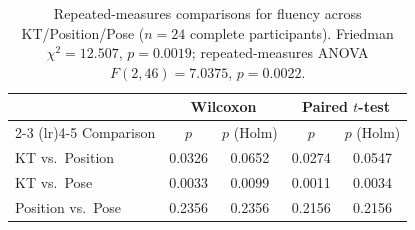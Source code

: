 \begin{table}[htbp]
\centering
\caption{Repeated-measures comparisons for fluency across KT/Position/Pose ($n = 24$ complete participants). Friedman $\chi^2 = 12.507$, $p = 0.0019$; repeated-measures ANOVA $F(2,46) = 7.0375$, $p = 0.0022$.}
\label{tab:comparisons-fluency}
\begin{tabular}{lcccc}
\toprule
& \multicolumn{2}{c}{Wilcoxon} & \multicolumn{2}{c}{Paired $t$-test} \\
\cmidrule(lr){2-3} \cmidrule(lr){4-5}
Comparison & $p$ & $p$ (Holm) & $p$ & $p$ (Holm) \\
\midrule
KT vs.\ Position   & 0.0326 & 0.0652 & 0.0274 & 0.0547 \\
KT vs.\ Pose       & 0.0033 & 0.0099 & 0.0011 & 0.0034 \\
Position vs.\ Pose & 0.2356 & 0.2356 & 0.2156 & 0.2156 \\
\bottomrule
\end{tabular}
\end{table}
